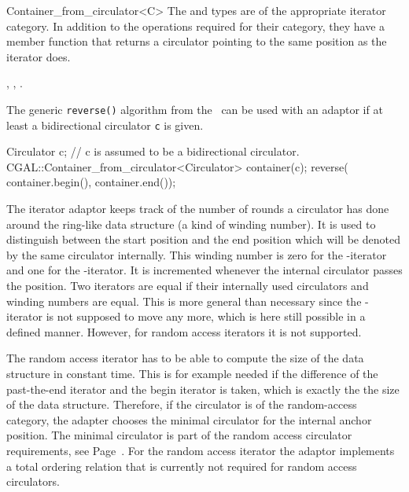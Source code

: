 \begin{ccRefClass}{Container_from_circulator<C>}
The  and  types are of the
appropriate iterator category. In addition to the operations required
for their category, they have a member function
 that returns a circulator pointing to the
same position as the iterator does.

\ccSeeAlso

, 
,
.

\ccExample

The generic {\tt reverse()} algorithm from the \stl\ can be used with an
adaptor if at least a bidirectional circulator {\tt c} is given.

\begin{ccExampleCode}
Circulator c;  // c is assumed to be a bidirectional circulator.
CGAL::Container_from_circulator<Circulator> container(c);
reverse( container.begin(), container.end());
\end{ccExampleCode}

\ccImplementation

The iterator adaptor keeps track of the number of rounds a circulator
has done around the ring-like data structure (a kind of winding
number). It is used to distinguish between the start position and the
end position which will be denoted by the same circulator internally.
This winding number is zero for the -iterator and one
for the -iterator.  It is incremented whenever the
internal circulator passes the  position. Two
iterators are equal if their internally used circulators and winding
numbers are equal. This is more general than necessary since the
-iterator is not supposed to move any more, which is
here still possible in a defined manner. However, for random access
iterators it is not supported.

The random access iterator has to be able to compute the size of the
data structure in constant time. This is for example needed if the
difference of the past-the-end iterator and the begin iterator is
taken, which is exactly the the size of the data structure.
Therefore, if the circulator is of the random-access category, the
adapter chooses the minimal circulator for the internal anchor
position. The minimal circulator is part of the random access
circulator requirements, see
Page~\pageref{sectionMinCircleRequ}.  For the random
access iterator the adaptor implements a total ordering relation that
is currently not required for random access circulators.

\end{ccRefClass}

